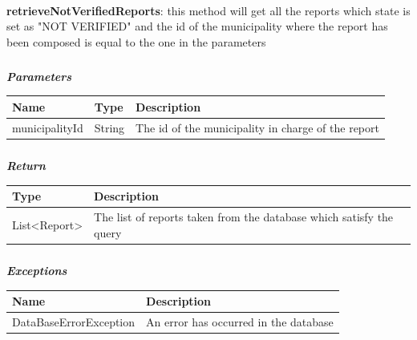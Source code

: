 						\paragraph{}
							\textbf{retrieveNotVerifiedReports}: this method will get all the reports which state is set as "NOT VERIFIED" and the id of the municipality where the report has been composed is equal to the one in the parameters
							\subparagraph{}
							\textit{\textbf{Parameters}}
							\vspace{-2mm}
								\begin{table}[!h]
									\begin{tabular}{L{0.2\textwidth}L{0.15\textwidth}L{0.45\textwidth}}
										\toprule
										\textbf{Name} & \textbf{Type} & Description \\
										\midrule
								  		municipalityId & String & The id of the municipality in charge of the report \\
								 		\bottomrule
									\end{tabular}
								\end{table}
							\vspace{-6mm}
							\subparagraph{}
								\textit{\textbf{Return}}
								\vspace{-2mm}
									\begin{table}[!h]
									\begin{tabular}{L{0.35\textwidth}L{0.45\textwidth}}
										\toprule
										\textbf{Type} & \textbf{Description} \\
										\midrule
								  	List<Report> & The list of reports taken from the database which satisfy the query \\
								 		\bottomrule
									\end{tabular}
								\end{table}
							\vspace{-6mm}
							\subparagraph{}
								\textit{\textbf{Exceptions}}
								\vspace{-2mm}
									\begin{table}[!h]
									\begin{tabular}{ll}
										\toprule
										\textbf{Name} & \textbf{Description} \\
										\midrule
								  		DataBaseErrorException & An error has occurred in the database \\
								 		\bottomrule
									\end{tabular}
								\end{table}
					
